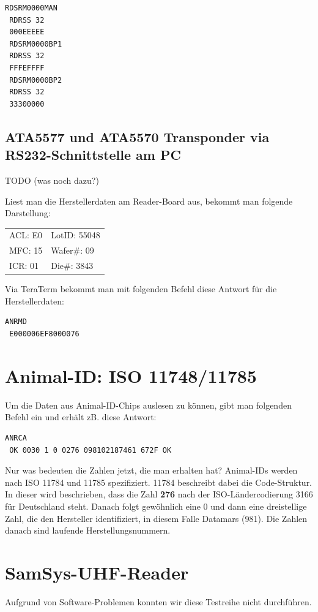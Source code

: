 \documentclass[paper=a4,fontsize=11pt,headsepline,footsepline,parskip=half]{scrartcl}
\begin{document}
\begin{lstlisting}[caption={Modulationsart ändern und Ausgabe anzeigen.}]
 RDSRM0000MAN
 RDRSS 32
 000EEEEE
 RDSRM0000BP1
 RDRSS 32
 FFFEFFFF
 RDSRM0000BP2
 RDRSS 32
 33300000
\end{lstlisting}

\subsection{ATA5577 und ATA5570 Transponder via RS232-Schnittstelle am PC}

TODO (was noch dazu?)

Liest man die Herstellerdaten am Reader-Board aus, bekommt man folgende Darstellung:

\begin{tabular}{ll}
 ACL: E0 & LotID: 55048\\
 MFC: 15 & Wafer\#: 09\\
 ICR: 01 & Die\#: 3843 
\end{tabular}

Via TeraTerm bekommt man mit folgenden Befehl diese Antwort für die Herstellerdaten:
 
\begin{lstlisting}[caption={Herstellerdaten auslesen.}]
 ANRMD
 E000006EF8000076
\end{lstlisting}

\section{Animal-ID: ISO 11748/11785}

Um die Daten aus Animal-ID-Chips auslesen zu können, gibt man folgenden Befehl ein und erhält zB. diese Antwort:

\begin{lstlisting}[caption={Animal-ID-Abfrage.}]
 ANRCA
 OK 0030 1 0 0276 098102187461 672F OK
\end{lstlisting}

Nur was bedeuten die Zahlen jetzt, die man erhalten hat? Animal-IDs werden nach ISO 11784 und 11785 spezifiziert. 11784 beschreibt dabei
die Code-Struktur. In dieser wird beschrieben, dass die Zahl \textbf{276} nach der ISO-Ländercodierung 3166 für Deutschland steht. Danach
folgt gewöhnlich eine 0 und dann eine dreistellige Zahl, die den Hersteller identifiziert, in diesem Falle Datamars (981). Die Zahlen danach
sind laufende Herstellungsnummern.

\section{SamSys-UHF-Reader}

Aufgrund von Software-Problemen konnten wir diese Testreihe nicht durchführen.
\end{document}
